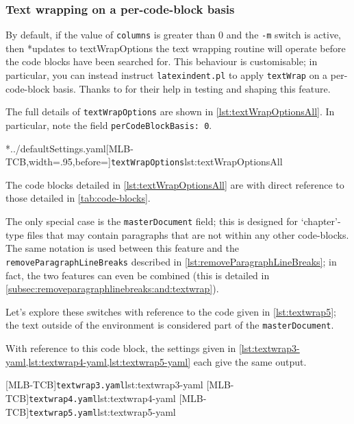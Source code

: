 \subsubsection{Text wrapping on a per-code-block basis}\label{subsec:text-wrap-per-code-block} By default, if the value of
	\texttt{columns} is greater than 0 and the \texttt{-m} switch is active,
	then%
	*{updates to textWrapOptions}
	the text wrapping routine will operate before the code blocks have been searched for.
	This behaviour is customisable; in particular, you can instead instruct
	\texttt{latexindent.pl} to apply \texttt{textWrap} on a per-code-block basis. Thanks to
	\cite{zoehneto} for their help in testing and shaping this feature.

	The full details of \texttt{textWrapOptions} are shown in \cref{lst:textWrapOptionsAll}.
	In particular, note the field \texttt{perCodeBlockBasis: 0}.

	\cmhlistingsfromfile*[style=textWrapOptionsAll]*{../defaultSettings.yaml}[MLB-TCB,width=.95\linewidth,before=\centering]{\texttt{textWrapOptions}}{lst:textWrapOptionsAll}

	The code blocks detailed in \cref{lst:textWrapOptionsAll} are with direct reference to
	those detailed in \vref{tab:code-blocks}.

	The only special case is the \texttt{masterDocument} field; this is designed for
	`chapter'-type files that may contain paragraphs that are not within any other
	code-blocks. The same notation is used between this feature and the
	\texttt{removeParagraphLineBreaks} described in \vref{lst:removeParagraphLineBreaks}; in
	fact, the two features can even be combined (this is detailed in
	\vref{subsec:removeparagraphlinebreaks:and:textwrap}).

	Let's explore these switches with reference to the code given in \cref{lst:textwrap5};
	the text outside of the environment is considered part of the \texttt{masterDocument}.

	\begin{widepage}
	\end{widepage}

	With reference to this code block, the settings given in
	\cref{lst:textwrap3-yaml,lst:textwrap4-yaml,lst:textwrap5-yaml} each give the same
	output.

	\begin{cmhtcbraster}[raster columns=3,
			raster left skip=-3.5cm,
			raster right skip=-2cm,
			raster column skip=.03\linewidth]
		[MLB-TCB]{\texttt{textwrap3.yaml}}{lst:textwrap3-yaml}
		[MLB-TCB]{\texttt{textwrap4.yaml}}{lst:textwrap4-yaml}
		[MLB-TCB]{\texttt{textwrap5.yaml}}{lst:textwrap5-yaml}
	\end{cmhtcbraster}

